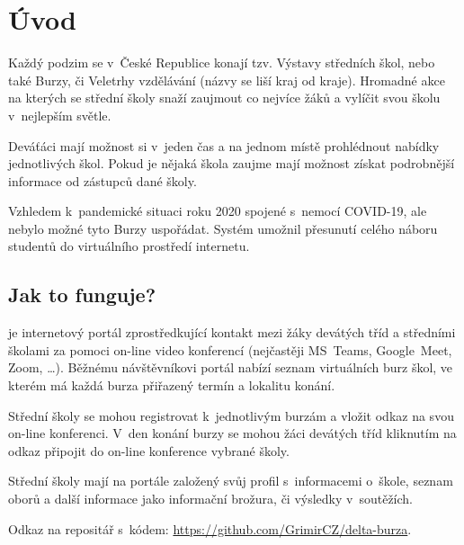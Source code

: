 \chapter*{Úvod}

Každý podzim se v~České Republice konají tzv. Výstavy středních škol, nebo také Burzy, či Veletrhy vzdělávání (názvy se liší kraj od kraje). Hromadné akce na kterých se střední školy snaží zaujmout co nejvíce žáků  a vylíčit svou školu v~nejlepším světle.

Deváťáci mají možnost si v~jeden čas a na jednom místě prohlédnout nabídky jednotlivých škol. Pokud je nějaká škola zaujme mají možnost získat podrobnější informace od zástupců dané školy. 

Vzhledem k~pandemické situaci roku 2020 spojené s~nemocí COVID-19, ale nebylo možné tyto Burzy uspořádat. Systém \bso{} umožnil přesunutí celého náboru studentů do virtuálního prostředí internetu.

\section*{Jak to funguje?}
\bso{} je internetový portál zprostředkující kontakt mezi žáky devátých tříd a středními školami za pomoci on-line video konferencí (nejčastěji MS~Teams\cite{ms-teams}, Google~Meet\cite{google-meet}, Zoom\cite{zoom}, \ldots). 
Běžnému návštěvníkovi portál nabízí seznam virtuálních burz škol, ve kterém má každá burza přiřazený termín a lokalitu konání.

Střední školy se mohou registrovat k~jednotlivým burzám a vložit odkaz na svou on-line konferenci. V~den konání burzy se mohou žáci devátých tříd kliknutím na odkaz připojit do on-line konference vybrané školy.

Střední školy mají na portále založený svůj profil s~informacemi o~škole, seznam oborů a další informace jako informační brožura, či výsledky v~soutěžích.

Odkaz na repositář s~kódem: \href{https://github.com/GrimirCZ/delta-burza}{https://github.com/GrimirCZ/delta-burza}.

\pagebreak

